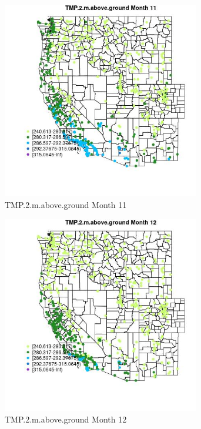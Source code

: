 \begin{figure} 
\centering  
\includegraphics[width=0.77\textwidth]{Code_Outputs/Report_ML_input_PM25_Step4_part_e_de_duplicated_aves_compiled_2019-05-21wNAs_MapObsMo11TMP2maboveground.jpg} 
\caption{\label{fig:Report_ML_input_PM25_Step4_part_e_de_duplicated_aves_compiled_2019-05-21wNAsMapObsMo11TMP2maboveground}TMP.2.m.above.ground Month 11} 
\end{figure} 
 

\begin{figure} 
\centering  
\includegraphics[width=0.77\textwidth]{Code_Outputs/Report_ML_input_PM25_Step4_part_e_de_duplicated_aves_compiled_2019-05-21wNAs_MapObsMo12TMP2maboveground.jpg} 
\caption{\label{fig:Report_ML_input_PM25_Step4_part_e_de_duplicated_aves_compiled_2019-05-21wNAsMapObsMo12TMP2maboveground}TMP.2.m.above.ground Month 12} 
\end{figure} 
 


